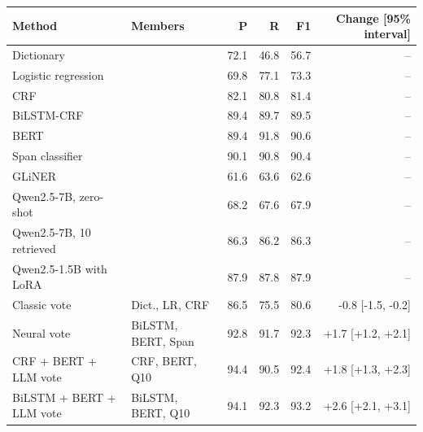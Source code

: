 \begingroup\small\setlength{\tabcolsep}{3pt}
\begin{tabular*}{\linewidth}{@{\extracolsep{\fill}}llrrrr@{}}
\toprule
Method & Members & P & R & F1 & Change [95\% interval] \\
\midrule
Dictionary &  & 72.1 & 46.8 & 56.7 & -- \\
Logistic regression &  & 69.8 & 77.1 & 73.3 & -- \\
CRF &  & 82.1 & 80.8 & 81.4 & -- \\
BiLSTM-CRF &  & 89.4 & 89.7 & 89.5 & -- \\
BERT &  & 89.4 & 91.8 & 90.6 & -- \\
Span classifier &  & 90.1 & 90.8 & 90.4 & -- \\
GLiNER &  & 61.6 & 63.6 & 62.6 & -- \\
Qwen2.5-7B, zero-shot &  & 68.2 & 67.6 & 67.9 & -- \\
Qwen2.5-7B, 10 retrieved &  & 86.3 & 86.2 & 86.3 & -- \\
Qwen2.5-1.5B with LoRA &  & 87.9 & 87.8 & 87.9 & -- \\
Classic vote & Dict., LR, CRF & 86.5 & 75.5 & 80.6 & -0.8 [-1.5, -0.2] \\
Neural vote & BiLSTM, BERT, Span & 92.8 & 91.7 & 92.3 & +1.7 [+1.2, +2.1] \\
CRF + BERT + LLM vote & CRF, BERT, Q10 & 94.4 & 90.5 & 92.4 & +1.8 [+1.3, +2.3] \\
BiLSTM + BERT + LLM vote & BiLSTM, BERT, Q10 & 94.1 & 92.3 & 93.2 & +2.6 [+2.1, +3.1] \\
\bottomrule
\end{tabular*}
\endgroup
\par\medskip
\begingroup\small\setlength{\tabcolsep}{3pt}

